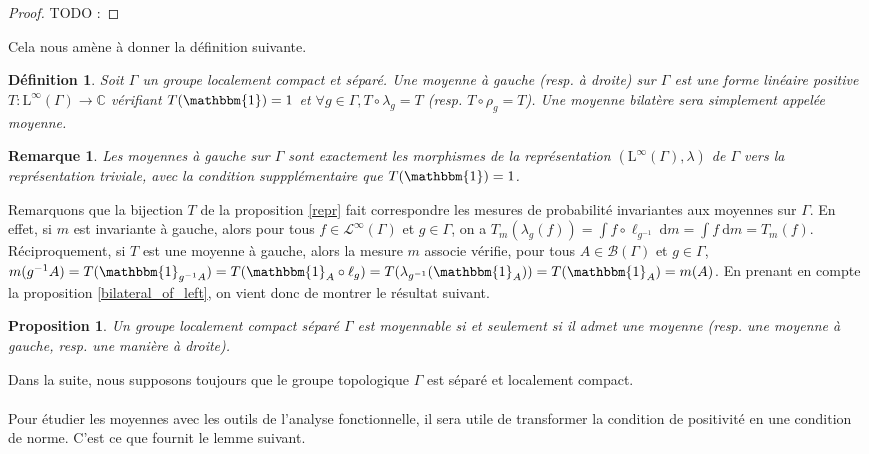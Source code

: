 \documentclass[a4paper,12pt]{article}
\newtheorem{proposition}[theorem]{Proposition}
\newtheorem{definition}[theorem]{Définition}
\newtheorem{remark}[theorem]{Remarque}
\newcommand{\C}{\mathbb{C}}
\newcommand{\Bor}{\mathcal{B}}
\newcommand{\indic}{\mathbbm{1}}
\newcommand{\integral}[2]{\int #1~\mathrm{d}#2}
\newcommand{\ssi}{si et seulement si }
\newcommand{\inv}{^{-1}}
\newcommand{\comp}{\circ}
\newcommand{\TODO}[1]{{\color{red}TODO :} #1}
\begin{document}
\begin{proof}
    \TODO{}
\end{proof}

Cela nous amène à donner la définition suivante.

\begin{definition}
    Soit $\Gamma$ un groupe localement compact et séparé. Une \emph{moyenne à gauche (resp. à droite)} sur $\Gamma$ est une forme 
    linéaire positive $T : \mathrm{L}^\infty(\Gamma)\to\C$ vérifiant $T(\indic) = 1$ et $\forall g\in\Gamma, T\comp\lambda_g = T$
    (resp. $T\comp\rho_g = T$). Une moyenne bilatère sera simplement appelée \emph{moyenne}.
\end{definition}

\begin{remark}
    Les moyennes à gauche sur $\Gamma$ sont exactement les morphismes de la représentation $(\mathrm{L}^\infty(\Gamma), \lambda)$ de 
    $\Gamma$ vers la représentation triviale, avec la condition suppplémentaire que $T(\indic) = 1$.
\end{remark}

Remarquons que la bijection $T$ de la proposition \ref{repr} fait correspondre les mesures de probabilité 
invariantes aux moyennes sur $\Gamma$. En effet, si $m$ est invariante à gauche, alors pour tous 
$f\in\mathscr{L}^\infty(\Gamma)$ et $g\in\Gamma$, on a 
$T_m(\lambda_g(f)) = \integral{f\comp\ell_{g\inv}}{m} = \integral{f}{m} = T_m(f)$. Réciproquement, si $T$ est une 
moyenne à gauche, alors la mesure $m$ associe vérifie, pour tous $A\in\Bor(\Gamma)$ et $g\in\Gamma$, 
$m(g\inv A) = T(\indic_{g\inv A}) = T(\indic_A \comp\ell_g) = T(\lambda_{g\inv}(\indic_A)) = T(\indic_A) = m(A)$.
En prenant en compte la proposition \ref{bilateral_of_left}, on vient donc de montrer le résultat suivant.
\begin{proposition}
    Un groupe localement compact séparé $\Gamma$ est moyennable \ssi il admet une moyenne (resp. une moyenne à gauche, resp. une manière à droite).
\end{proposition}

Dans la suite, nous supposons toujours que le groupe topologique $\Gamma$ est séparé et localement compact.
\paragraph{}

Pour étudier les moyennes avec les outils de l'analyse fonctionnelle, il sera utile de transformer la condition de positivité en une condition
de norme. C'est ce que fournit le lemme suivant.
\end{document}
